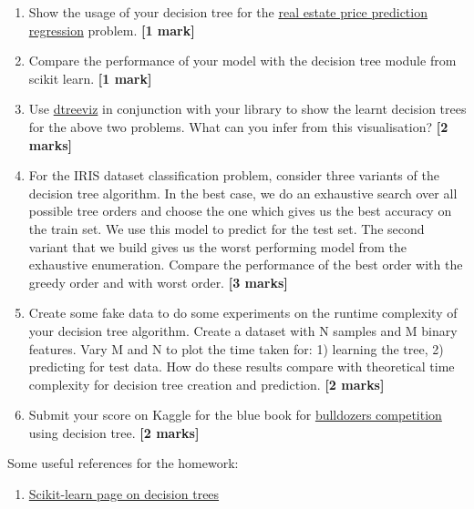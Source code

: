 \documentclass[colorlinks]{article}
\begin{document}
\begin{enumerate}
	\item Show the usage of your decision tree for the \href{https://archive.ics.uci.edu/ml/datasets/Real+estate+valuation+data+set}{real estate price prediction regression} problem. \textbf{[1 mark]}
	\item Compare the performance of your model with the decision tree module from scikit learn. \textbf{[1 mark]}
	\item Use \href{https://github.com/parrt/dtreeviz}{dtreeviz} in conjunction with your library to show the learnt decision trees for the above two problems. What can you infer from this visualisation? \textbf{[2 marks]}
	\item For the IRIS dataset classification problem, consider three variants of the decision tree algorithm. In the best case, we do an exhaustive search over all possible tree orders and choose the one which gives us the best accuracy on the train set. We use this model to predict for the test set. The second variant that we build gives us the worst performing model from the exhaustive enumeration. Compare the performance of the best order with the greedy order and with worst order. \textbf{[3 marks]}
	\item Create some fake data to do some experiments on the runtime complexity of your decision tree algorithm. Create a dataset with N samples and M binary features. Vary M and N to plot the time taken for: 1) learning the tree, 2) predicting for test data. How do these results compare with theoretical time complexity for decision tree creation and prediction. \textbf{[2 marks]}
	\item Submit your score on Kaggle for the blue book for \href{https://www.kaggle.com/c/bluebook-for-bulldozers}{bulldozers competition} using decision tree. \textbf{[2 marks]}

	
	
	

\end{enumerate}


Some useful references for the homework:

\begin{enumerate}
	\item \href{https://scikit-learn.org/stable/modules/tree.html}{Scikit-learn page on decision trees}
\end{enumerate}
\end{document}
